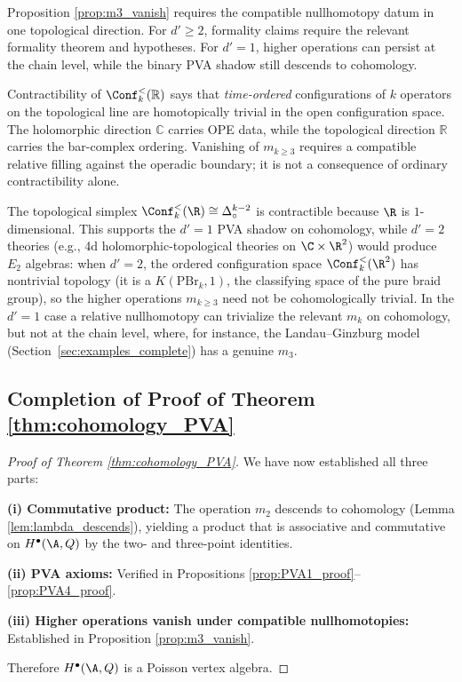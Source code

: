 \begin{remark}[The Role of $d'=1$]
Proposition \ref{prop:m3_vanish} requires the compatible
nullhomotopy datum in one topological direction. For $d' \geq 2$,
formality claims require the relevant formality theorem and
hypotheses. For $d'=1$, higher operations can persist at the chain
level, while the binary PVA shadow still descends to cohomology.
\end{remark}

\begin{remark}
Contractibility of $\Conf_k^{<}(\mathbb{R})$ says that
\emph{time-ordered} configurations of $k$ operators on the topological
line are homotopically trivial in the open configuration space. The
holomorphic direction $\mathbb{C}$ carries OPE data, while the
topological direction $\mathbb{R}$ carries the bar-complex ordering.
Vanishing of $m_{k \geq 3}$ requires a compatible relative filling
against the operadic boundary; it is not a consequence of ordinary
contractibility alone.
\end{remark}

\begin{remark}[Why $d'=1$ produces PVAs and $d'=2$ produces $E_2$ algebras]
The topological simplex
$\Conf_k^{<}(\R) \cong \Delta^{k-2}_{\circ}$ is contractible
because $\R$ is $1$-dimensional. This supports the $d'=1$
PVA shadow on cohomology, while $d'=2$ theories (e.g.,
4d holomorphic-topological theories on $\C \times \R^2$) would
produce $E_2$ algebras: when $d'=2$, the ordered configuration
space $\Conf_k^{<}(\R^2)$ has nontrivial topology (it is a
$K(\mathrm{PBr}_k,1)$, the classifying space of the pure braid
group), so the higher operations $m_{k \geq 3}$ need not be
cohomologically trivial. In the $d'=1$ case a relative
nullhomotopy can trivialize the relevant $m_k$ on cohomology, but
not at the chain level,
where, for instance, the Landau--Ginzburg model
(Section~\ref{sec:examples_complete}) has a genuine $m_3$.
\end{remark}

\subsection{Completion of Proof of Theorem \ref{thm:cohomology_PVA}}

\begin{proof}[Proof of Theorem \ref{thm:cohomology_PVA}]
We have now established all three parts:

\textbf{(i) Commutative product:} The operation $m_2$ descends to
cohomology (Lemma \ref{lem:lambda_descends}), yielding a product that
is associative and commutative on $H^\bullet(\A,Q)$ by the two- and
three-point identities.

\textbf{(ii) PVA axioms:} Verified in Propositions \ref{prop:PVA1_proof}--\ref{prop:PVA4_proof}.

\textbf{(iii) Higher operations vanish under compatible
nullhomotopies:} Established in Proposition \ref{prop:m3_vanish}.

Therefore $H^\bullet(\A,Q)$ is a Poisson vertex algebra.
\end{proof}

